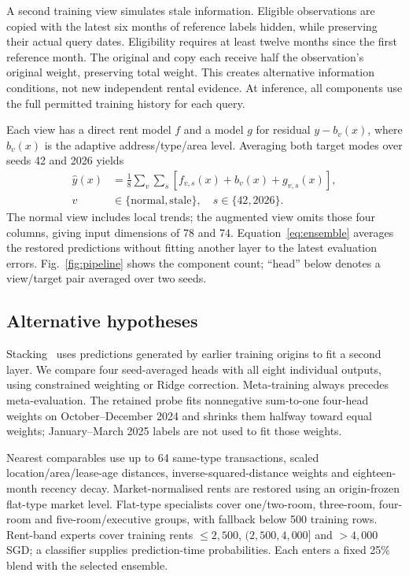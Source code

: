 \documentclass[conference]{IEEEtran}
\begin{document}
A second training view simulates stale information. Eligible observations are copied with the latest six months of reference labels hidden, while preserving their actual query dates. Eligibility requires at least twelve months since the first reference month. The original and copy each receive half the observation's original weight, preserving total weight. This creates alternative information conditions, not new independent rental evidence. At inference, all components use the full permitted training history for each query.

Each view has a direct rent model $f$ and a model $g$ for residual $y-b_v(x)$, where $b_v(x)$ is the adaptive address/type/area level. Averaging both target modes over seeds 42 and 2026 yields
\begin{equation}
\begin{aligned}
\widehat y(x)&=\frac{1}{8}\sum_v\sum_s
\left[f_{v,s}(x)+b_v(x)+g_{v,s}(x)\right],\\
v&\in\{\mathrm{normal},\mathrm{stale}\},\quad s\in\{42,2026\}.
\end{aligned}
\label{eq:ensemble}
\end{equation}
The normal view includes local trends; the augmented view omits those four columns, giving input dimensions of 78 and 74. Equation~\eqref{eq:ensemble} averages the restored predictions without fitting another layer to the latest evaluation errors. Fig.~\ref{fig:pipeline} shows the component count; ``head'' below denotes a view/target pair averaged over two seeds.

\subsection{Alternative hypotheses}
Stacking~\cite{Wolpert_1992} uses predictions generated by earlier training origins to fit a second layer. We compare four seed-averaged heads with all eight individual outputs, using constrained weighting or Ridge correction. Meta-training always precedes meta-evaluation. The retained probe fits nonnegative sum-to-one four-head weights on October--December 2024 and shrinks them halfway toward equal weights; January--March 2025 labels are not used to fit those weights.

Nearest comparables use up to 64 same-type transactions, scaled location/area/lease-age distances, inverse-squared-distance weights and eighteen-month recency decay. Market-normalised rents are restored using an origin-frozen flat-type market level. Flat-type specialists cover one/two-room, three-room, four-room and five-room/executive groups, with fallback below 500 training rows. Rent-band experts cover training rents $\leq2{,}500$, $(2{,}500,4{,}000]$ and $>4{,}000$ SGD; a classifier supplies prediction-time probabilities. Each enters a fixed 25\% blend with the selected ensemble.
\end{document}
